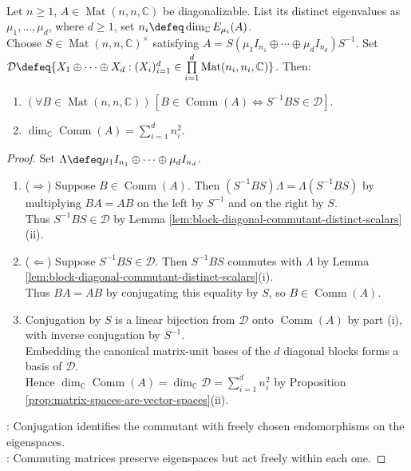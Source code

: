 \begin{theorem} \label{thm:commutant-of-diagonalizable-matrix} \\
Let $n\geq1$, $A\in\operatorname{Mat}(n,n,\mathbb{C})$ be diagonalizable. List its distinct eigenvalues as $\mu_1,\ldots,\mu_d$, where $d\geq1$, set $n_i\defeq\dim_{\mathbb{C}}E_{\mu_i}(A)$.\\
Choose $S\in\operatorname{Mat}(n,n,\mathbb{C})^{\times}$ satisfying $A=S(\mu_1I_{n_1}\oplus\cdots\oplus\mu_dI_{n_d})S^{-1}$. Set $\mathcal{D}\defeq\{X_1\oplus\cdots\oplus X_d:(X_i)_{i=1}^{d}\in\prod\limits_{i=1}^{d}\operatorname{Mat}(n_i,n_i,\mathbb{C})\}$. Then:
\begin{enumerate}[label=(\roman*)]
\setlength{\itemsep}{0pt}
\item $(\forall B\in\operatorname{Mat}(n,n,\mathbb{C}))\,[B\in\operatorname{Comm}(A)\Longleftrightarrow S^{-1}BS\in\mathcal{D}]$.
\item $\dim_{\mathbb{C}}\operatorname{Comm}(A)=\sum\limits_{i=1}^{d}n_i^2$.
\end{enumerate}
\begin{proof}
Set $\Lambda\defeq\mu_1I_{n_1}\oplus\cdots\oplus\mu_dI_{n_d}$.
\begin{enumerate}[label=(\roman*)]
\setlength{\itemsep}{0pt}
\item[$(i)$] ($\Rightarrow$) Suppose $B\in\operatorname{Comm}(A)$. Then $(S^{-1}BS)\Lambda=\Lambda(S^{-1}BS)$ by multiplying $BA=AB$ on the left by $S^{-1}$ and on the right by $S$.\\
Thus $S^{-1}BS\in\mathcal{D}$ by Lemma \ref{lem:block-diagonal-commutant-distinct-scalars}(ii).
\item[$(i)$] ($\Leftarrow$) Suppose $S^{-1}BS\in\mathcal{D}$. Then $S^{-1}BS$ commutes with $\Lambda$ by Lemma \ref{lem:block-diagonal-commutant-distinct-scalars}(i).\\
Thus $BA=AB$ by conjugating this equality by $S$, so $B\in\operatorname{Comm}(A)$.
\item[$(ii)$] Conjugation by $S$ is a linear bijection from $\mathcal{D}$ onto $\operatorname{Comm}(A)$ by part (i), with inverse conjugation by $S^{-1}$.\\
Embedding the canonical matrix-unit bases of the $d$ diagonal blocks forms a basis of $\mathcal{D}$.\\
Hence $\dim_{\mathbb{C}}\operatorname{Comm}(A)=\dim_{\mathbb{C}}\mathcal{D}=\sum\limits_{i=1}^{d}n_i^2$ by Proposition \ref{prop:matrix-spaces-are-vector-spaces}(ii).
\end{enumerate}
: Conjugation identifies the commutant with freely chosen endomorphisms on the eigenspaces.\\
: Commuting matrices preserve eigenspaces but act freely within each one.
\end{proof}
\end{theorem}

